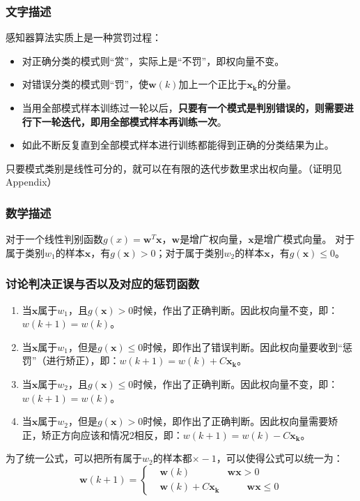 \documentclass[12pt, letterpaper]{article}
\begin{document}
\subsubsection*{文字描述}
感知器算法实质上是一种赏罚过程：
\begin{itemize}
\item 对正确分类的模式则“赏”，实际上是“不罚”，即权向量不变。
\item 对错误分类的模式则“罚”，使$\mathbf{w}(k)$加上一个正比于$\mathbf{x_k}$的分量。
\item 当用全部模式样本训练过一轮以后，\textbf{只要有一个模式是判别错误的，则需要进行下一轮迭代，即用全部模式样本再训练一次}。
\item 如此不断反复直到全部模式样本进行训练都能得到正确的分类结果为止。
\end{itemize}
只要模式类别是线性可分的，就可以在有限的迭代步数里求出权向量。（证明见Appendix）

\subsubsection*{数学描述}
对于一个线性判别函数$g(x)=\mathbf{w}^T\mathbf{x}$，$\mathbf{w}$是增广权向量，$\mathbf{x}$是增广模式向量。
对于属于类别$w_1$的样本$\mathbf{x}$，有$g(\mathbf{x})>0$；对于属于类别$w_2$的样本$\mathbf{x}$，有$g(\mathbf{x})\leq0$。
\subsubsection*{讨论判决正误与否以及对应的惩罚函数}
\begin{enumerate}
\item 当$\mathbf{x}$属于$w_1$，且$g(\mathbf{x})>0$时候，作出了正确判断。因此权向量不变，即：$w(k+1) = w (k)$。
\item 当$\mathbf{x}$属于$w_1$，但是$g(\mathbf{x})\leq0$时候，即作出了错误判断。因此权向量要收到“惩罚”（进行矫正），即：$w(k+1) = w (k)+C\mathbf{x_k}$。
\item 当$\mathbf{x}$属于$w_2$，且$g(\mathbf{x})\leq0$时候，作出了正确判断。因此权向量不变，即：$w(k+1) = w (k)$。
\item 当$\mathbf{x}$属于$w_2$，但是$g(\mathbf{x})>0$时候，即作出了正确判断。因此权向量需要矫正，矫正方向应该和情况$2$相反，即：$w(k+1) = w (k)-C\mathbf{x_k}$。
\end{enumerate}

为了统一公式，可以把所有属于$w_2$的样本都$\times-1$，可以使得公式可以统一为：
\begin{equation}
\mathbf{w}(k+1)=\left\{
\begin{aligned}	
& \mathbf{w}(k) \qquad &\mathbf{w}\mathbf{x}>0\\
& \mathbf{w}(k)+C\mathbf{x_k} &\qquad \mathbf{wx}\leq0
\end{aligned}
\right.
\end{equation}
\end{document}
